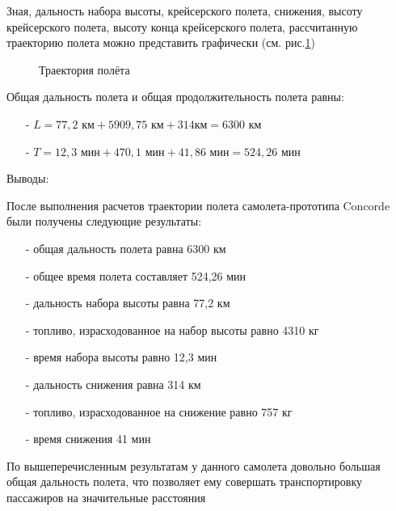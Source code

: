 Зная, дальность набора высоты, крейсерского полета, снижения, высоту крейсерского полета, высоту конца крейсерского полета, рассчитанную траекторию полета можно представить графически (см. рис.\ref{fig:Траектория полёта}) 


\begin{figure}[H]
    \caption{Траектория полёта}
    \label{fig:Траектория полёта}
\end{figure}

Общая дальность полета и общая продолжительность полета равны:
\begin{itemize}
    \item [-] $L = 77,2 \text{ км} + 5909,75 \text{ км} + 314км = 6300\text{ км}$
    \item [-] $T = 12,3 \text{ мин} + 470,1 \text{ мин} + 41,86 \text{ мин} = 524,26 \text{ мин}$
\end{itemize}

\begin{center}
    Выводы:
\end{center}

После выполнения расчетов траектории полета самолета-прототипа Concorde
были получены следующие результаты:
\begin{itemize}
\item[-] общая дальность полета равна 6300 км
\item[-] общее время полета составляет 524,26 мин
\item[-] дальность набора высоты равна 77,2 км
\item[-] топливо, израсходованное на набор высоты равно 4310 кг
\item[-] время набора высоты равно 12,3 мин
\item[-] дальность снижения равна 314 км
\item[-] топливо, израсходованное на снижение равно 757 кг
\item[-] время снижения 41 мин
\end{itemize}
По вышеперечисленным результатам у данного самолета довольно большая
общая дальность полета, что позволяет ему совершать транспортировку
пассажиров на значительные расстояния 